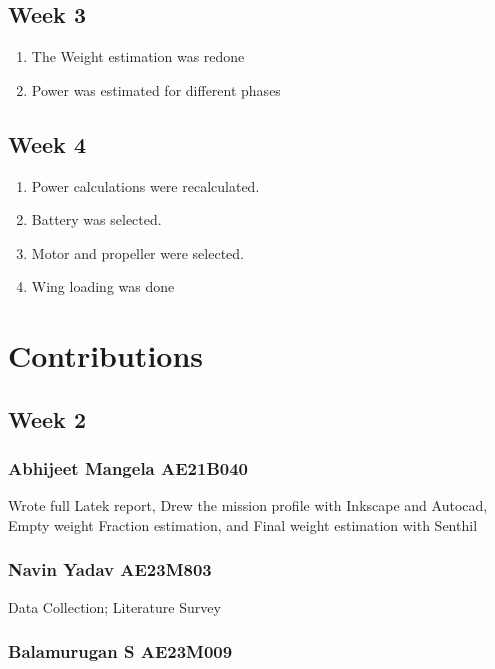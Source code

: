 \documentclass[12 pt]{article}
\begin{document}
\subsection{Week 3}
\begin{enumerate}
    \item The Weight estimation was redone
    \item Power was estimated for different phases 
\end{enumerate}

\subsection{Week 4}
\begin{enumerate}
    \item Power calculations were recalculated.
    \item Battery was selected.
    \item Motor and propeller were selected.
    \item Wing loading was done
\end{enumerate}

\newpage


\section{Contributions}

\subsection{Week 2}

\subsubsection{Abhijeet Mangela AE21B040}
Wrote full Latek report, Drew the mission profile with Inkscape and Autocad, Empty weight Fraction estimation, and Final weight estimation with Senthil

\subsubsection{Navin Yadav AE23M803}

Data Collection; Literature Survey

\subsubsection{Balamurugan S AE23M009}
\end{document}

